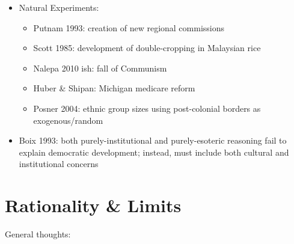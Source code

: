 \documentclass[12pt]{article}
\begin{document}
\begin{itemize}
    \item Natural Experiments:
    \begin{itemize}
        \item Putnam 1993: creation of new regional commissions
        \item Scott 1985: development of double-cropping in Malaysian rice 
        \item Nalepa 2010 ish: fall of Communism
        \item Huber \& Shipan: Michigan medicare reform
        \item Posner 2004: ethnic group sizes using post-colonial borders as exogenous/random
    \end{itemize}
    \item Boix 1993: both purely-institutional and purely-esoteric reasoning fail to explain democratic development; instead, must include both cultural and institutional concerns
\end{itemize}




\section*{Rationality \& Limits}

General thoughts: 
\end{document}
